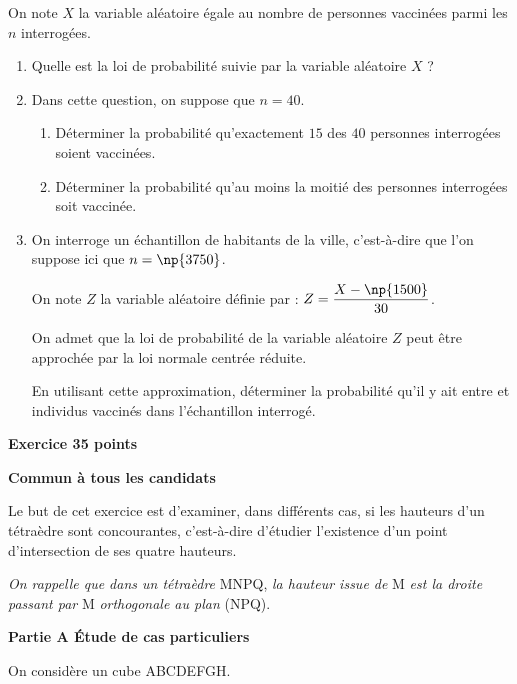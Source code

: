 \documentclass[10pt,a4paper]{article}
\begin{document}
On note $X$ la variable aléatoire égale au nombre de personnes vaccinées parmi les $n$
interrogées.

\medskip

\begin{enumerate}
\item Quelle est la loi de probabilité suivie par la variable aléatoire $X$ ?
\item Dans cette question, on suppose que $n = 40$.
	\begin{enumerate}
		\item Déterminer la probabilité qu'exactement $15$ des $40$ personnes interrogées soient vaccinées.
		\item Déterminer la probabilité qu'au moins la moitié des personnes interrogées soit vaccinée.
 	\end{enumerate}
\item  On interroge un échantillon de  habitants de la ville, c'est-à-dire que l'on suppose ici que $n = \np{3750}$.
	
On note $Z$ la variable aléatoire définie par : $Z = \dfrac{X - \np{1500}}{30}$.
	
On admet que la loi de probabilité de la variable aléatoire $Z$ peut être approchée par la
loi normale centrée réduite.
	
En utilisant cette approximation, déterminer la probabilité qu'il y ait entre  et  individus vaccinés dans l'échantillon interrogé.
\end{enumerate}

\vspace{0,5cm}

\textbf{Exercice 3\hfill 5 points}

\textbf{Commun à tous les candidats }

\bigskip

Le but de cet exercice est d'examiner, dans différents cas, si les hauteurs d'un tétraèdre sont concourantes, c'est-à-dire d'étudier l'existence d'un point d'intersection de ses quatre hauteurs.

\emph{On rappelle que dans un tétraèdre} MNPQ, \emph{la hauteur issue de} M \emph{est la droite passant par} M \emph{orthogonale au plan} (NPQ).

\bigskip

\textbf{Partie A Étude de cas particuliers}

\medskip

On considère un cube ABCDEFGH.
\end{document}
